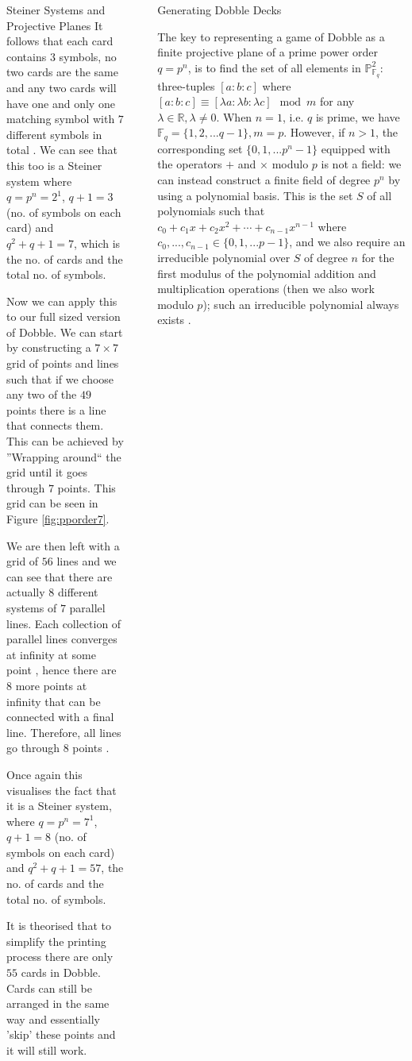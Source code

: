 \documentclass[final]{beamer}
\newlength{\sepwidth}
\newlength{\colwidth}
\newcommand{\separatorcolumn}{\begin{column}{\sepwidth}\end{column}}
\begin{document}
\begin{frame}[t]
\begin{columns}[t]
\begin{column}{\colwidth}
\begin{block}{Steiner Systems and Projective Planes}
    It follows that each card contains $3$ symbols, no two cards are the same and any two cards will have one and only one matching symbol with $7$ different symbols in total \cite{westenbrink2022}.
    We can see that this too is a Steiner system where $q = p^n = 2^1$, $q + 1 = 3$ (no. of symbols on each card) and $q^2 + q + 1 = 7$, which is the no. of cards and the total no. of symbols.
    
    Now we can apply this to our full sized version of Dobble. We can start by constructing a $7\times7$ grid of points and lines such that if we choose any two of the $49$ points there is a line that connects them. This can be achieved by ''Wrapping around`` the grid until it goes through $7$ points. This grid can be seen in Figure \ref{fig:pporder7}.

    We are then left with a grid of $56$ lines and we can see that there are actually $8$ different systems of $7$ parallel lines. Each collection of parallel lines converges at infinity at some point \cite{spencer1999}, hence there are $8$ more points at infinity that can be connected with a final line. Therefore, all lines go through $8$ points \cite{Parker2021}.

    Once again this visualises the fact that it is a Steiner system, where $q = p^n = 7^1$, $q + 1 = 8$ (no. of symbols on each card) and $q^2 + q + 1 = 57$, the no. of cards and the total no. of symbols. 

    It is theorised that to simplify the printing process there are only $55$ cards in Dobble. Cards can still be arranged in the same way and essentially 'skip' these points and it will still work. 
\end{block}
\end{column}

\separatorcolumn

\begin{column}{\colwidth}

  \begin{exampleblock}{Generating Dobble Decks}

    The key to representing a game of Dobble as a finite projective plane of a prime power order $q = p^n$, is to find the set of all elements in $\mathbb{P}^2_{\mathbb{F}_q}$: three-tuples $[a : b : c]$ where $[a : b : c] \equiv [\lambda a : \lambda b : \lambda c] \mod m$ for any $\lambda \in \mathbb{R}, \lambda \ne 0$. When $n = 1$, i.e. $q$ is prime, we have $\mathbb{F}_q = \{1, 2, ... q-1\}, m = p$. However, if $n > 1$, the corresponding set $\{ 0, 1, ... p^n-1 \}$ equipped with the operators $+$ and $\times$ modulo $p$ is not a field: we can instead construct a finite field of degree $p^n$ by using a polynomial basis. This is the set $S$ of all polynomials such that $c_0 + c_1x + c_2x^2 + \cdots + c_{n-1}x^{n-1}$ where $c_0, ..., c_{n-1} \in \{0, 1, ... p-1\}$, and we also require an irreducible polynomial over $S$ of degree $n$ for the first modulus of the polynomial addition and multiplication operations (then we also work modulo $p$); such an irreducible polynomial always exists \cite{magidin2012}.


\end{exampleblock}
\end{column}
\end{columns}
\end{frame}
\end{document}
